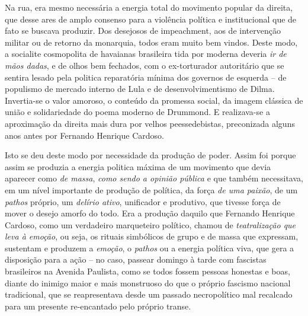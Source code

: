 Na rua, era mesmo necessária a energia total do movimento popular da
direita, que desse ares de amplo consenso para a violência política e
institucional que de fato se buscava produzir. Dos desejosos de
impeachment, aos de intervenção militar ou de retorno da monarquia,
todos eram muito bem vindos. Deste modo, a socialite cosmopolita de
havaianas brasileira tida por moderna deveria \emph{ir de mãos dadas}, e
de olhos bem fechados, com o ex-torturador autoritário que se sentira
lesado pela politica reparatória mínima dos governos de esquerda -- de
populismo de mercado interno de Lula e de desenvolvimentismo de Dilma.
Invertia-se o valor amoroso, o conteúdo da promessa social, da imagem
clássica de união e solidariedade do poema moderno de Drummond. E
realizava-se a aproximação da direita mais dura por velhos
peessedebistas, preconizada alguns anos antes por Fernando Henrique
Cardoso.

Isto se deu deste modo por necessidade da produção de poder. Assim foi
porque assim se produzia a energia politica máxima de um movimento que
devia aparecer como \emph{de massa}, \emph{como sendo a opinião pública}
e que também necessitava, em um nível importante de produção de
política, da força \emph{de uma paixão}, de um \emph{pathos} próprio, um
\emph{delírio ativo}, unificador e produtivo, que tivesse força de mover
o desejo amorfo do todo. Era a produção daquilo que Fernando Henrique
Cardoso, como um verdadeiro marqueteiro político, chamou de
\emph{teatralização que leva à emoção}, ou seja, os rituais simbólicos
de grupo e de massa que expressam, sustentam e produzem a \emph{emoção},
o \emph{pathos} ou a energia política viva, que gera a disposição para a
ação -- no caso, passear domingo à tarde com fascistas brasileiros na
Avenida Paulista, como se todos fossem pessoas honestas e boas, diante
do inimigo maior e mais monstruoso do que o próprio fascismo nacional
tradicional, que se reapresentava desde um passado necropolítico mal
recalcado para um presente re-encantado pelo próprio transe.

